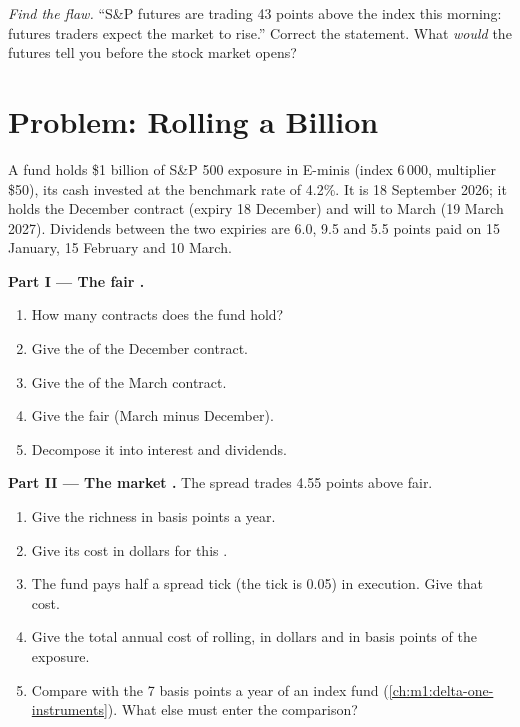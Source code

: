 \begin{exercise}[$\star\star\star$]\label{exo:m1:basis-roll-and-delivery:8}
\emph{Find the flaw.} ``S\&P futures are trading 43 points above the index
this morning: futures traders expect the market to rise.'' Correct the
statement. What \emph{would} the futures tell you before the stock market
opens?
\end{exercise}

\section{Problem: Rolling a Billion}

\begin{problem}\label{pb:m1:basis-roll-and-delivery:1}
A fund holds \$1 billion of S\&P 500 exposure in E-minis (index 6\,000,
multiplier \$50), its cash invested at the benchmark rate of 4.2\%. It is 18
September 2026; it holds the December contract (expiry 18 December) and will
 to March (19 March 2027). Dividends between the two expiries are 6.0,
9.5 and 5.5 points paid on 15 January, 15 February and 10 March.

\medskip\noindent\textbf{Part I --- The fair .}
\begin{enumerate}
\item How many contracts does the fund hold?
\item Give the  of the December contract.
\item Give the  of the March contract.
\item Give the fair  (March minus December).
\item Decompose it into interest and dividends.
\end{enumerate}

\medskip\noindent\textbf{Part II --- The market .}
The spread trades 4.55 points above fair.
\begin{enumerate}[resume]
\item Give the richness in basis points a year.
\item Give its cost in dollars for this .
\item The fund pays half a spread tick (the tick is 0.05) in execution.
Give that cost.
\item Give the total annual cost of rolling, in dollars and in basis points
of the exposure.
\item Compare with the 7 basis points a year of an index fund
(\cref{ch:m1:delta-one-instruments}). What else must enter the comparison?
\end{enumerate}


\end{problem}

